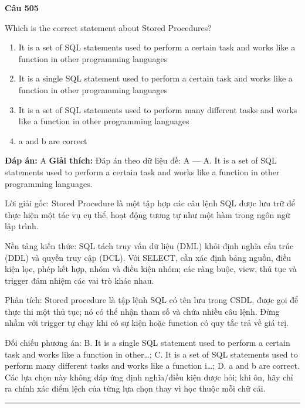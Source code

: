 \documentclass[11pt,a4paper]{article}
\newenvironment{question}[1]{%
  \par\vspace{1em}\noindent\textbf{\large Câu #1}\par\vspace{0.4em}
}{%
  \par\vspace{1em}\hrule\vspace{0.6em}
}
\newenvironment{choices}{%
  \begin{enumerate}[label=\textbf{\Alph*.},leftmargin=2.2em,itemsep=2pt,topsep=3pt]
}{%
  \end{enumerate}
}
\newcommand{\choice}{\item}
\begin{document}
\begin{question}{505}
Which is the correct statement about Stored Procedures?
\begin{choices}
\choice It is a set of SQL statements used to perform a certain task and works like a function in other programming languages
\choice It is a single SQL statement used to perform a certain task and works like a function in other programming languages
\choice It is a set of SQL statements used to perform many different tasks and works like a function in other programming languages
\choice a and b are correct
\end{choices}
\textbf{Đáp án:} A
\textbf{Giải thích:} Đáp án theo dữ liệu đề: A — A. It is a set of SQL statements used to perform a certain task and works like a function in other programming languages.

Lời giải gốc: Stored Procedure là một tập hợp các câu lệnh SQL được lưu trữ để thực hiện một tác vụ cụ thể, hoạt động tương tự như một hàm trong ngôn ngữ lập trình.

Nền tảng kiến thức: SQL tách truy vấn dữ liệu (DML) khỏi định nghĩa cấu trúc (DDL) và quyền truy cập (DCL). Với SELECT, cần xác định bảng nguồn, điều kiện lọc, phép kết hợp, nhóm và điều kiện nhóm; các ràng buộc, view, thủ tục và trigger đảm nhiệm các vai trò khác nhau.

Phân tích: Stored procedure là tập lệnh SQL có tên lưu trong CSDL, được gọi để thực thi một thủ tục; nó có thể nhận tham số và chứa nhiều câu lệnh. Đừng nhầm với trigger tự chạy khi có sự kiện hoặc function có quy tắc trả về giá trị.

Đối chiếu phương án: B. It is a single SQL statement used to perform a certain task and works like a function in other…; C. It is a set of SQL statements used to perform many different tasks and works like a function i…; D. a and b are correct. Các lựa chọn này không đáp ứng định nghĩa/điều kiện được hỏi; khi ôn, hãy chỉ ra chính xác điểm lệch của từng lựa chọn thay vì học thuộc mỗi chữ cái.
\end{question}
\end{document}
